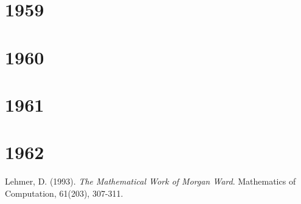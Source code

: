 \documentclass[a4paper, 12pt]{book}
\begin{document}
	\chapter{1959}
	
	\chapter{1960}
	
	\chapter{1961}
	
	\chapter{1962}
	
	
	\backmatter
	\begin{thebibliography}{99}
		 Lehmer, D. (1993). \textit{The Mathematical Work of Morgan Ward}. Mathematics of Computation, 61(203), 307-311.
	\end{thebibliography}
\end{document}
